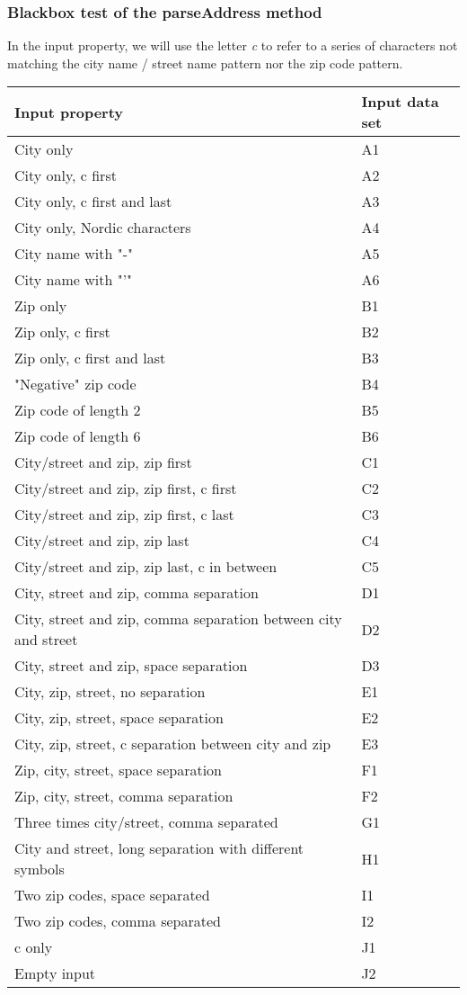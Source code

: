\documentclass[a4paper,11pt]{article}
\begin{document}
\subsubsection{Blackbox test of the parseAddress method}
In the input property, we will use the letter \textit{c} to refer to a series of characters not matching the city name / street name pattern nor the zip code pattern.
\begin{tabular}{ p{9cm} | p{2cm}}
	\textbf{Input property} & \textbf{Input data set} \\
	\hline
	City only & A1 \\
	City only, c first & A2 \\
	City only, c first and last & A3 \\
	City only, Nordic characters & A4 \\
	City name with "-" & A5 \\
	City name with "'" & A6 \\
	Zip only & B1 \\
	Zip only, c first & B2 \\
	Zip only, c first and last & B3 \\
	"Negative" zip code & B4 \\
	Zip code of length 2 & B5 \\
	Zip code of length 6 & B6 \\
	City/street and zip, zip first & C1 \\
	City/street and zip, zip first, c first & C2 \\
	City/street and zip, zip first, c last & C3 \\
	City/street and zip, zip last & C4 \\
	City/street and zip, zip last, c in between & C5 \\
	City, street and zip, comma separation & D1 \\
	City, street and zip, comma separation between city and street & D2 \\
	City, street and zip, space separation & D3 \\
	City, zip, street, no separation & E1 \\
	City, zip, street, space separation & E2 \\
	City, zip, street, c separation between city and zip & E3 \\
	Zip, city, street, space separation & F1 \\
	Zip, city, street, comma separation & F2 \\
	Three times city/street, comma separated & G1 \\
	City and street, long separation with different symbols & H1 \\
	Two zip codes, space separated & I1 \\
	Two zip codes, comma separated & I2 \\
	c only & J1 \\
	Empty input & J2
\end{tabular}
\end{document}
